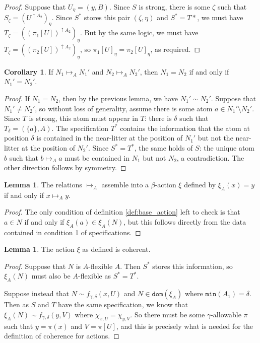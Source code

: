 \documentclass{article}
\theoremstyle{definition}
\newtheorem{lemma}[theorem]{Lemma}
\newtheorem{corollary}[theorem]{Corollary}
\theoremstyle{remark}
\begin{document}
{\begin{proof}
  Suppose that $U_\eta = (y, B)$.
  Since $S$ is strong, there is some $\zeta$ such that $S_\zeta = (U^{\uparrow A_2})_\eta$.
  Since $S^*$ stores this pair $(\zeta, \eta)$ and $S^* = T*$, we must have $T_\zeta = ((\pi_1[U])^{\uparrow A_2})_\eta$.
  But by the same logic, we must have $T_\zeta = ((\pi_2[U])^{\uparrow A_2})_\eta$, so $\pi_1[U]_\eta = \pi_2[U]_\eta$, as required.
\end{proof}
\begin{corollary}
  If $N_1 \mapsto_A N_1'$ and $N_2 \mapsto_A N_2'$, then $N_1 = N_2$ if and only if $N_1' = N_2'$.
\end{corollary}
\begin{proof}
  If $N_1 = N_2$, then by the previous lemma, we have $N_1' \sim N_2'$.
  Suppose that $N_1' \neq N_2'$, so without loss of generality, assume there is some atom $a \in N_1' \setminus N_2'$.
  Since $T$ is strong, this atom must appear in $T$: there is $\delta$ such that $T_\delta = (\{a\}, A)$.
  The specification $T^*$ contains the information that the atom at position $\delta$ is contained in the near-litter at the position of $N_1'$ but not the near-litter at the position of $N_2'$.
  Since $S^* = T^*$, the same holds of $S$: the unique atom $b$ such that $b \mapsto_A a$ must be contained in $N_1$ but not $N_2$, a contradiction.
  The other direction follows by symmetry.
\end{proof}
\begin{lemma}
  The relations $\mapsto_A$ assemble into a $\beta$-action $\xi$ defined by $\xi_A(x) = y$ if and only if $x \mapsto_A y$.
\end{lemma}
\begin{proof}
  The only condition of definition \ref{def:base_action} left to check is that $a \in N$ if and only if $\xi_A(a) \in \xi_A(N)$, but this follows directly from the data contained in condition 1 of specifications.
\end{proof}
\begin{lemma}
  The action $\xi$ as defined is coherent.
\end{lemma}
\begin{proof}
  Suppose that $N$ is $A$-flexible $A$.
  Then $S^*$ stores this information, so $\xi_A(N)$ must also be $A$-flexible as $S^* = T^*$.

  Suppose instead that $N \sim f_{\gamma,\delta}(x,U)$ and $N \in \mathtt{dom}(\xi_A)$ where $\mathtt{min}(A_1) = \delta$.
  Then as $S$ and $T$ have the same specification, we know that $\xi_A(N) \sim f_{\gamma,\delta}(y,V)$ where $\chi_{x,U} = \chi_{y,V}$.
  So there must be some $\gamma$-allowable $\pi$ such that $y = \pi(x)$ and $V = \pi[U]$, and this is precisely what is needed for the definition of coherence for actions.
\end{proof}

}
\end{document}
